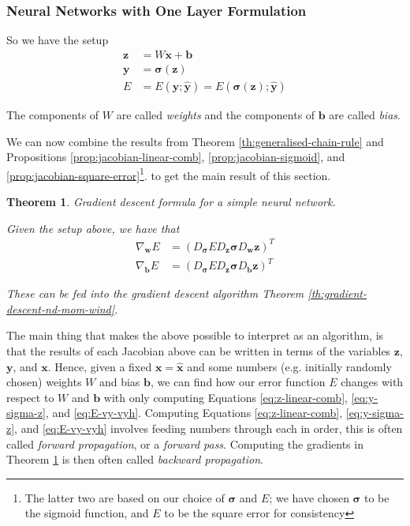 \documentclass[a4paper]{article}
\theoremstyle{plain} %
\newtheorem{theorem}{Theorem}[section]
\theoremstyle{definition} %
\numberwithin{equation}{subsection}
\newcommand{\vx}{{\textbf{x}}}
\newcommand{\vy}{{\textbf{y}}}
\newcommand{\vz}{{\textbf{z}}}
\newcommand{\vw}{{\textbf{w}}}
\newcommand{\vb}{{\textbf{b}}}
\newcommand{\vsigma}{{\bm{\sigma}}} %
\newcommand{\vxh}{{\widehat{\textbf{x}}}}
\newcommand{\vyh}{{\widehat{\textbf{y}}}}
\begin{document}
\subsubsection{Neural Networks with One Layer Formulation}

So we have the setup
\begin{align}
  \vz &= W \vx + \vb \label{eq:z-linear-comb}\\
  \vy &= \vsigma (\vz) \label{eq:y-sigma-z}\\
  E &= E(\vy; \vyh) = E(\vsigma(\vz); \vyh) \label{eq:E-vy-vyh}
\end{align}

The components of $W$ are called \emph{weights} and the components of $\vb$ are called \emph{bias}.

We can now combine the results from Theorem \ref{th:generalised-chain-rule} and 
Propositions \ref{prop:jacobian-linear-comb}, \ref{prop:jacobian-sigmoid}, and 
\ref{prop:jacobian-square-error}\footnote{The latter two are based on our choice of $\vsigma$ and $E$; we have chosen $\vsigma$ to be the sigmoid function, and $E$ to be the square error for consistency}.
 to get the main result of this section.

\begin{theorem} \label{th:nn-one-layer}
  Gradient descent formula for a simple neural network.

  Given the setup above, we have that
  \begin{align*}
\nabla_\vw E &= (D_\vsigma E D_\vz \vsigma D_\vw \vz)^T \\
\nabla_\vb E &= (D_\vsigma E D_\vz \vsigma D_\vb \vz)^T
\end{align*}

These can be fed into the gradient descent algorithm Theorem \ref{th:gradient-descent-nd-mom-wind}.
\end{theorem}

The main thing that makes the above possible to interpret as an algorithm, 
is that the results of each Jacobian above can be written in terms of the variables $\vz$, $\vy$, and $\vx$. 
Hence, given a fixed $\vx = \vxh$ and some numbers (e.g. initially randomly chosen) weights $W$ and bias $\vb$, 
we can find how our error function $E$ changes with respect to $W$ and $\vb$ with only computing Equations
\ref{eq:z-linear-comb}, \ref{eq:y-sigma-z}, and \ref{eq:E-vy-vyh}. 
Computing Equations
\ref{eq:z-linear-comb}, \ref{eq:y-sigma-z}, and \ref{eq:E-vy-vyh} 
involves feeding numbers through each in order, this is often called \emph{forward propagation}, or a \emph{forward pass}. 
Computing the gradients in Theorem \ref{th:nn-one-layer} is then often called \emph{backward propagation}.
\end{document}
